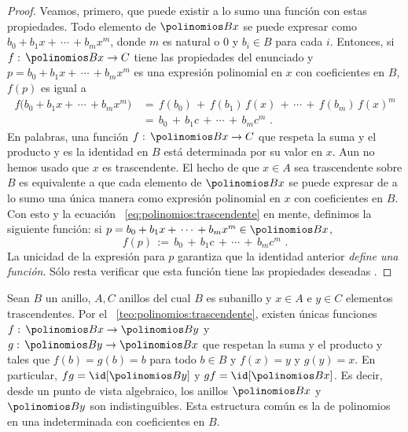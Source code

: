\begin{proof}
	Veamos, primero, que puede existir a lo sumo una funci\'on con
	estas propiedades. Todo elemento de $\polinomios B x$ se puede
	expresar como $b_0+b_1x+\,\cdots\,+b_mx^m$, donde $m$ es natural o
	$0$ y $b_i\in B$ para cada $i$. Entonces, si
	$f:\,\polinomios B x\rightarrow C$ tiene las
	propiedades del enunciado y $p=b_0+b_1x+\,\cdots\,+b_mx^m$ es una
	expresi\'on polinomial en $x$ con coeficientes en $B$, $f(p)$ es
	igual a
	\begin{equation}
		\label{eq:polinomios:trascendente}
		\begin{aligned}
			f\big(b_0+b_1x+\,\cdots\,+b_mx^m\big) & \,=\,
				f(b_0)\,+\,f(b_1)\,f(x)\,+\,\cdots\,+\,
					f(b_m)\,f(x)^m \\
			& \,=\, b_0\,+\,b_1c\,+\,\cdots\,+\,b_mc^m
			\text{ .}
		\end{aligned}
	\end{equation}
	En palabras, una funci\'on
	$f:\,\polinomios B x\rightarrow C$ que respeta la
	suma y el producto y es la identidad en $B$ est\'a determinada
	por su valor en $x$. Aun no hemos usado que $x$ es trascendente.
	El hecho de que $x\in A$ sea trascendente sobre $B$ es equivalente
	a que cada elemento de $\polinomios B x$ se puede expresar de a lo
	sumo una \'unica manera como expresi\'on polinomial en $x$ con
	coeficientes en $B$. Con esto y la ecuaci\'on~%
	\eqref{eq:polinomios:trascendente} en mente, definimos la siguiente
	funci\'on: si $p=b_0+b_1x+\,\cdots\,+b_mx^m\in\polinomios B x$,
	\begin{displaymath}
		f(p)\,:=\,
			b_0\,+\,b_1c\,+\,\cdots\,+\,b_mc^m
		\text{ .}
	\end{displaymath}
	La unicidad de la expresi\'on para $p$ garantiza que la
	identidad anterior \emph{define una funci\'on}.
	S\'olo resta verificar que esta funci\'on tiene las propiedades
	deseadas \quedacomoejercicio.
\end{proof}

\begin{obsPolinomios}\label{obs:polinomios:trascendente}
	Sean $B$ un anillo, $A,C$ anillos del cual $B$ es subanillo y
	$x\in A$ e $y\in C$ elementos trascendentes. Por
	el \teoname~\ref{teo:polinomios:trascendente},
	existen
	\'unicas funciones $f:\,\polinomios B x\rightarrow\polinomios B y$ y
	$g:\,\polinomios B y\rightarrow\polinomios B x$ que respetan la suma
	y el producto y tales que $f(b)=g(b)=b$ para todo $b\in B$ y
	$f(x)=y$ y $g(y)=x$. En particular, $fg=\id[{\polinomios B y}]$ y
	$gf=\id[{\polinomios B x}]$. Es decir, desde un punto de vista
	algebraico, los anillos $\polinomios B x$ y $\polinomios B y$ son
	indistinguibles.
	Esta estructura com\'un es la %
	de polinomios en una indeterminada con coeficientes en $B$.
\end{obsPolinomios}

